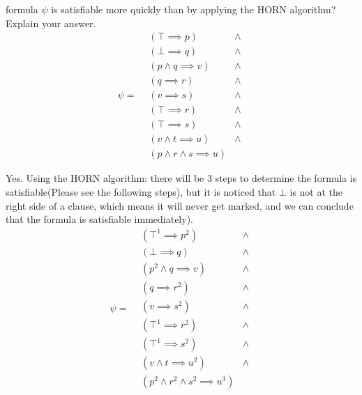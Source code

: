 \documentclass{article}
\begin{document}
\begin{enumerate}
    formula $\psi$ is satisfiable more quickly than by
    applying the HORN algorithm?  Explain your answer.
  \begin{displaymath}
    \psi = 
    \begin{array}{|lll}
        & (\top \implies p)                  & \land \\
        & (\bot \implies q)                  & \land \\
        & (p \land q \implies v)             & \land \\
        & (q \implies r)                     & \land \\
        & (v \implies s)                     & \land \\
        & (\top \implies r)                  & \land \\
        & (\top \implies s)                  & \land \\
        & (v \land t \implies u)             & \land \\
        & (p \land r \land s \implies u)     & 
    \end{array}
  \end{displaymath}
 \begin{answer}
    Yes. Using the HORN algorithm: there will be 3
    steps to determine the formula is satisfiable(Please see 
    the following steps), but it is noticed that $\bot$ is not 
    at the right side of a clause, which means it will never
    get marked, and we can conclude that the formula is 
    satisfiable immediately).\\
    \begin{displaymath}
      \psi = 
      \begin{array}{|lll}
          & (\top^1 \implies p^2)                  & \land \\
          & (\bot \implies q)                  & \land \\
          & (p^2 \land q \implies v)             & \land \\
          & (q \implies r^2)                     & \land \\
          & (v \implies s^2)                     & \land \\
          & (\top^1 \implies r^2)                  & \land \\
          & (\top^1 \implies s^2)                  & \land \\
          & (v \land t \implies u^2)             & \land \\
          & (p^2 \land r^2 \land s^2 \implies u^3)     & 
      \end{array}
    \end{displaymath}
  \end{answer}
\end{enumerate}
\end{document}
